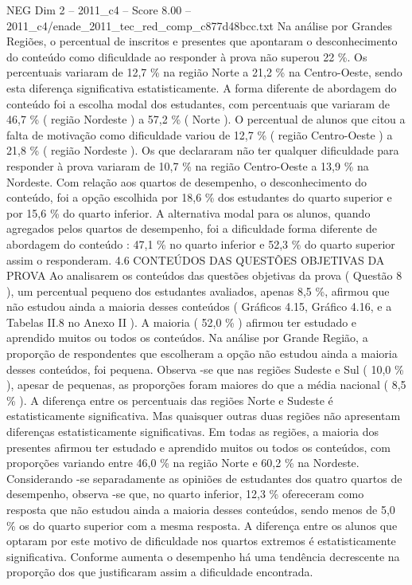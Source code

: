 \begin{textsample}{NEG Dim 2 – 2011\_c4 – Score 8.00 – 2011\_c4/enade\_2011\_tec\_red\_comp\_c877d48bcc.txt}
Na análise por Grandes Regiões, o percentual de inscritos e presentes que apontaram o desconhecimento do conteúdo como dificuldade ao responder à prova não superou 22 \%.
Os percentuais variaram de 12,7 \% na região Norte a 21,2 \% na Centro-Oeste, sendo esta diferença significativa estatisticamente.
A forma diferente de abordagem do conteúdo foi a escolha modal dos estudantes, com percentuais que variaram de 46,7 \% ( região Nordeste ) a 57,2 \% ( Norte ).
O percentual de alunos que citou a falta de motivação como dificuldade variou de 12,7 \% ( região Centro-Oeste ) a 21,8 \% ( região Nordeste ).
Os que declararam não ter qualquer dificuldade para responder à prova variaram de 10,7 \% na região Centro-Oeste a 13,9 \% na Nordeste.
Com relação aos quartos de desempenho, o desconhecimento do conteúdo, foi a opção escolhida por 18,6 \% dos estudantes do quarto superior e por 15,6 \% do quarto inferior.
A alternativa modal para os alunos, quando agregados pelos quartos de desempenho, foi a dificuldade forma diferente de abordagem do conteúdo : 47,1 \% no quarto inferior e 52,3 \% do quarto superior assim o responderam. 4.6 CONTEÚDOS DAS QUESTÕES OBJETIVAS DA PROVA Ao analisarem os conteúdos das questões objetivas da prova ( Questão 8 ), um percentual pequeno dos estudantes avaliados, apenas 8,5 \%, afirmou que não estudou ainda a maioria desses conteúdos ( Gráficos 4.15, Gráfico 4.16, e a Tabelas II.8 no Anexo II ).
A maioria ( 52,0 \% ) afirmou ter estudado e aprendido muitos ou todos os conteúdos.
Na análise por Grande Região, a proporção de respondentes que escolheram a opção não estudou ainda a maioria desses conteúdos, foi pequena.
Observa -se que nas regiões Sudeste e Sul ( 10,0 \% ), apesar de pequenas, as proporções foram maiores do que a média nacional ( 8,5 \% ).
A diferença entre os percentuais das regiões Norte e Sudeste é estatisticamente significativa.
Mas quaisquer outras duas regiões não apresentam diferenças estatisticamente significativas.
Em todas as regiões, a maioria dos presentes afirmou ter estudado e aprendido muitos ou todos os conteúdos, com proporções variando entre 46,0 \% na região Norte e 60,2 \% na Nordeste.
Considerando -se separadamente as opiniões de estudantes dos quatro quartos de desempenho, observa -se que, no quarto inferior, 12,3 \% ofereceram como resposta que não estudou ainda a maioria desses conteúdos, sendo menos de 5,0 \% os do quarto superior com a mesma resposta.
A diferença entre os alunos que optaram por este motivo de dificuldade nos quartos extremos é estatisticamente significativa.
Conforme aumenta o desempenho há uma tendência decrescente na proporção dos que justificaram assim a dificuldade encontrada.

\end{textsample}
